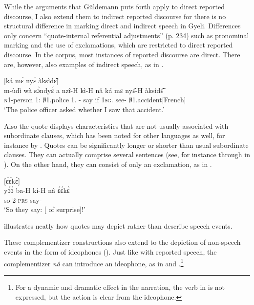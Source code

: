 While the arguments that Güldemann puts forth apply to direct reported discourse, I also extend them to indirect reported discourse for there is no structural difference in marking direct and indirect speech in Gyeli. Differences only concern ``quote-internal referential adjustments'' (p. 234) such as pronominal marking and the use of exclamations, which are restricted to direct reported discourse. In the corpus, most instances of reported discourse are direct.
There are, however, also examples of indirect speech, as in .


\ea\label{IRS}
  \textsubscript{{\QI}} [ká mɛ̀ nyɛ́ àksìdɛ̃̂]\textsubscript{{\RD}}\\
        {\db}m-ùdì wà sɔ̀ndyɛ́ a nzî-H kì-H nâ {\db}ká mɛ nyɛ̂-H àksìdɛ̃̂ \\
         {\db}\textsc{n}1-person 1:{\ATT} $\emptyset$1.police 1.{\PST} {\PROG}-{\R} say {\COMP} {\db}if 1\textsc{sg}.{\PST} see-{\R} $\emptyset$1.accident[French] \\
    \trans `The police officer asked whether I saw that accident.'
\z

Also the quote displays characteristics that are not usually associated with subordinate clauses, which has been noted for other languages as well, for instance by \citet{spronck2017}. Quotes can be significantly longer or shorter than usual subordinate clauses. They can actually comprise several sentences (see, for instance  through  in ).
On the other hand, they can consist of only an exclamation, as in .


\ea\label{RS6}
  \glll  [yɔ́ɔ̀ bá kí nâ]\textsubscript{{\QI}} [ɛ́ɛ́kɛ̀]\textsubscript{{\RD}} \\
            {\db}yɔ́ɔ̀ ba-H ki-H nâ {\db}ɛ́ɛ́kɛ̀ \\
         {\db}so 2-\textsc{prs} say-{\R} {\COMP} {\db}{\EXCL} \\
    \trans `So they say: [{\EXCL} of surprise]!'
\z



\noindent {} illustrates neatly how quotes may depict rather than describe speech events.


 These complementizer constructions also extend to the depiction of non-speech events in the form of ideophones (). Just like with reported speech, the complementizer {\itshape nâ} can introduce an ideophone, as in  and .\footnote{For a dynamic and dramatic effect in the narration, the verb in  is not expressed, but the action is clear from the ideophone.}


